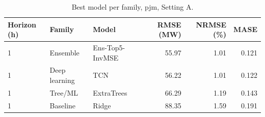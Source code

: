 \begin{table}[ht]
\centering
\small
\caption{Best model per family, pjm, Setting A.}
\label{tab:pjm_A_by_family}
\begin{tabular}{lllrrr}
\toprule
Horizon (h) & Family & Model & RMSE (MW) & NRMSE (\%) & MASE \\
\midrule
1 & Ensemble & Ens-Top5-InvMSE & 55.97 & 1.01 & 0.121 \\
1 & Deep learning & TCN & 56.22 & 1.01 & 0.122 \\
1 & Tree/ML & ExtraTrees & 66.29 & 1.19 & 0.143 \\
1 & Baseline & Ridge & 88.35 & 1.59 & 0.191 \\
\bottomrule
\end{tabular}
\end{table}